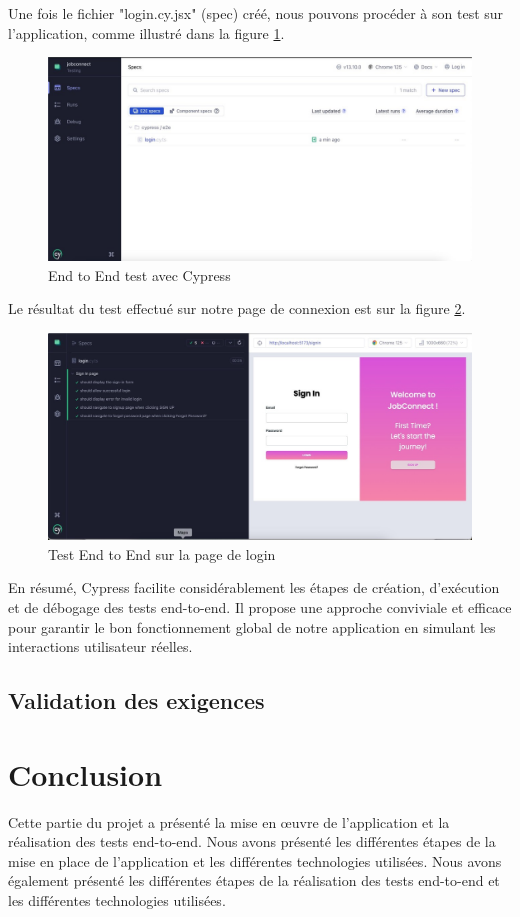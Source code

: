 Une fois le fichier "login.cy.jsx" (spec) créé, nous pouvons procéder à son test sur l'application, comme illustré dans la figure \ref{fig:cy3}.

\begin{figure}[htbp]
   \centering
   \includegraphics[scale=0.4]{cypress/4.jpg} 
   \caption{End to End test avec Cypress}
   \label{fig:cy3}
\end{figure}

Le résultat du test effectué sur notre page de connexion est sur la figure \ref{fig:cy5}.

\begin{figure}[htbp]
   \centering
   \includegraphics[scale=0.4]{cypress/5.jpg} 
   \caption{Test End to End sur la page de login}
   \label{fig:cy5}
\end{figure}

En résumé, Cypress facilite considérablement les étapes de création, d’exécution et de débogage des tests end-to-end. Il propose une approche conviviale et efficace pour garantir le bon fonctionnement global de notre application en simulant les interactions utilisateur réelles.
\subsection{Validation des exigences}

\section{Conclusion}
Cette partie du projet a présenté la mise en œuvre de l'application et  la  réalisation  des tests end-to-end. 
Nous avons présenté les différentes étapes de la mise en place de l'application et les différentes
technologies utilisées. Nous avons également présenté les différentes étapes de la réalisation des tests
end-to-end et les différentes technologies utilisées. 
\newline
